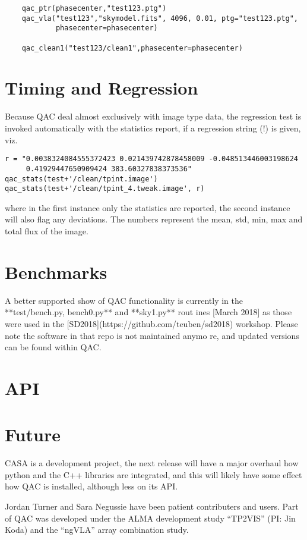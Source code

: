 \documentclass[11pt,twoside]{article}
\begin{document}
\footnotesize
\begin{verbatim}
    qac_ptr(phasecenter,"test123.ptg")
    qac_vla("test123","skymodel.fits", 4096, 0.01, ptg="test123.ptg",
            phasecenter=phasecenter)
            
    qac_clean1("test123/clean1",phasecenter=phasecenter)
\end{verbatim}
\normalsize

\section{Timing and Regression}

Because QAC deal almost exclusively with image type data, the regression test is invoked automatically
with the statistics report, if a regression string (!) is given, viz.

\footnotesize
\begin{verbatim}
r = "0.0038324084555372423 0.021439742878458009 -0.048513446003198624
     0.41929447650909424 383.60327838373536"
qac_stats(test+'/clean/tpint.image')
qac_stats(test+'/clean/tpint_4.tweak.image', r)
\end{verbatim}
\normalsize

where in the first instance only the statistics are reported, the second instance will also flag any deviations.
The numbers represent the mean, std, min, max and total flux of the image.

\section{Benchmarks}

A better supported show of QAC functionality is currently in the **test/bench.py, bench0.py** and **sky1.py** rout
ines [March 2018] as those were used in the
[SD2018](https://github.com/teuben/sd2018) workshop. Please note the software in that repo is not maintained anymo
re, and updated versions can be found
within QAC.

\section{API}




\section{Future}

CASA is a development project, the next
release will have a major overhaul how python and the C++ libraries
are integrated, and this will likely have some effect how QAC is
installed, although less on its API. 

\acknowledgements Jordan Turner and Sara Negussie have been patient contributers and users.
Part of QAC was developed under the ALMA development study ``TP2VIS''  (PI: Jin Koda) and
the ``ngVLA'' array combination study.


\end{document}
